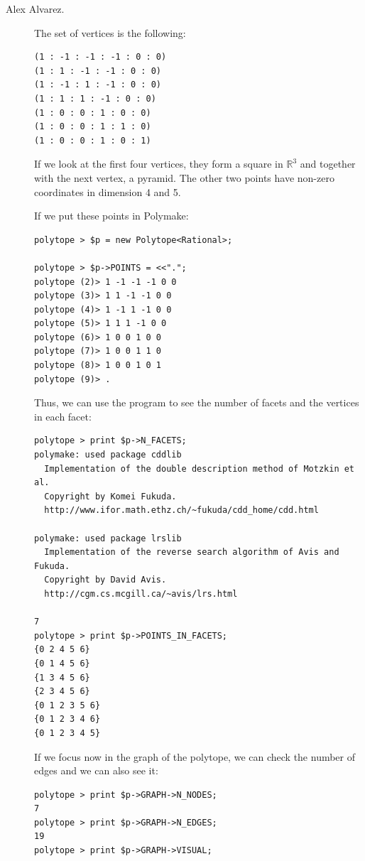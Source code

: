 \begin{description}
\item [Alex Alvarez.] The set of vertices is the following:
\begin{verbatim}
(1 : -1 : -1 : -1 : 0 : 0)
(1 : 1 : -1 : -1 : 0 : 0)
(1 : -1 : 1 : -1 : 0 : 0)
(1 : 1 : 1 : -1 : 0 : 0)
(1 : 0 : 0 : 1 : 0 : 0)
(1 : 0 : 0 : 1 : 1 : 0)
(1 : 0 : 0 : 1 : 0 : 1)
\end{verbatim}
If we look at the first four vertices, they form a square in $\mathbb{R}^3$ and together with the next vertex, a pyramid. The other two points have non-zero coordinates in dimension 4 and 5.

If we put these points in Polymake:
\begin{verbatim}
polytope > $p = new Polytope<Rational>;

polytope > $p->POINTS = <<".";
polytope (2)> 1 -1 -1 -1 0 0
polytope (3)> 1 1 -1 -1 0 0
polytope (4)> 1 -1 1 -1 0 0
polytope (5)> 1 1 1 -1 0 0
polytope (6)> 1 0 0 1 0 0
polytope (7)> 1 0 0 1 1 0
polytope (8)> 1 0 0 1 0 1
polytope (9)> .
\end{verbatim}

Thus, we can use the program to see the number of facets and the vertices in each facet:

\begin{verbatim}
polytope > print $p->N_FACETS;
polymake: used package cddlib
  Implementation of the double description method of Motzkin et al.
  Copyright by Komei Fukuda.
  http://www.ifor.math.ethz.ch/~fukuda/cdd_home/cdd.html

polymake: used package lrslib
  Implementation of the reverse search algorithm of Avis and Fukuda.
  Copyright by David Avis.
  http://cgm.cs.mcgill.ca/~avis/lrs.html

7
polytope > print $p->POINTS_IN_FACETS;
{0 2 4 5 6}
{0 1 4 5 6}
{1 3 4 5 6}
{2 3 4 5 6}
{0 1 2 3 5 6}
{0 1 2 3 4 6}
{0 1 2 3 4 5}
\end{verbatim}

If we focus now in the graph of the polytope, we can check the number of edges and we can also see it:
\begin{verbatim}
polytope > print $p->GRAPH->N_NODES;
7
polytope > print $p->GRAPH->N_EDGES;
19
polytope > print $p->GRAPH->VISUAL;
\end{verbatim}


\end{description}
